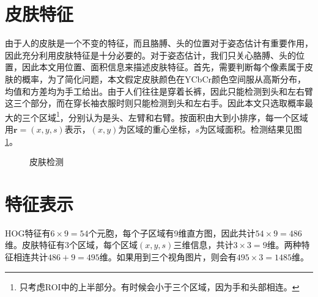 \section{皮肤特征}
由于人的皮肤是一个不变的特征，而且胳膊、头的位置对于姿态估计有重要作用，因此充分利用皮肤特征是十分必要的。对于姿态估计，我们只关心胳膊、头的位置，因此本文用位置、面积信息来描述皮肤特征。首先，需要判断每个像素属于皮肤的概率，为了简化问题，本文假定皮肤颜色在YCbCr颜色空间服从高斯分布，均值和方差均为手工给出。由于人们往往是穿着长裤，因此只能检测到头和左右臂这三个部分，而在穿长袖衣服时则只能检测到头和左右手。因此本文只选取概率最大的三个区域\footnote{只考虑ROI中的上半部分。有时候会小于三个区域，因为手和头部相连。}，分别认为是头、左臂和右臂。按面积由大到小排序，每一个区域用$\mathbf{r}=(x,y,s)$表示，$(x,y)$为区域的重心坐标，$s$为区域面积。检测结果见图\ref{fig:skin}。
\begin{figure}[H]
  \centering
  \hspace{1cm}
  \caption{皮肤检测}\label{fig:skin}
\end{figure}

\section{特征表示}
\label{sec:feature}
HOG特征有$6\times 9=54$个元胞，每个子区域有9维直方图，因此共计$54\times 9=486$维。皮肤特征有3个区域，每个区域$(x,y,s)$三维信息，共计$3\times 3=9$维。两种特征相连共计$486+9=495$维。如果用到三个视角图片，则会有$495\times 3=1485$维。
